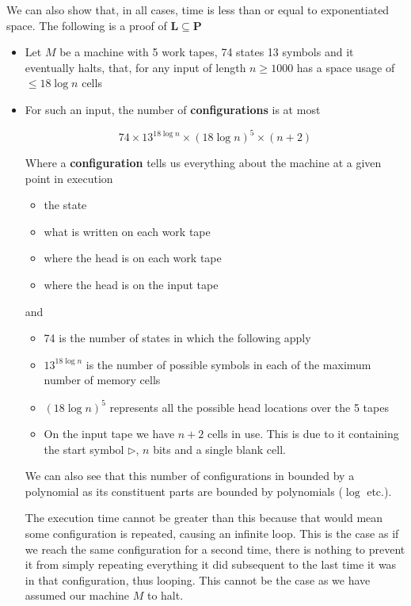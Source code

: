 \documentclass{article}
\begin{document}
  We can also show that, in all cases, time is less than or equal to exponentiated space.
  The following is a proof of $\mathbf{L} \subseteq \mathbf{P} $

  \begin{itemize}
    \item Let $M$ be a machine with 5 work tapes, 74 states 13 symbols and it eventually halts, that, for any input of length $n\geq 1000$ has a space usage of $\leq 18\log n$ cells

    \item For such an input, the number of \textbf{configurations} is at most

          \[
          74 \times 13^{18\log n} \times (18\log n)^{5}\times (n+2)
          \]

          Where a \textbf{configuration} tells us everything about the machine at a given point in execution
          \begin{itemize}
            \item the state
            \item what is written on each work tape
            \item where the head is on each work tape
            \item where the head is on the input tape
          \end{itemize}

          and

          \begin{itemize}
            \item 74 is the number of states in which the following apply
            \item $13^{18\log n}$ is the number of possible symbols in each of the maximum number of memory cells
            \item $(18\log n)^{5}$ represents all the possible head locations over the 5 tapes
            \item On the input tape we have $n+2$ cells in use. This is due to it containing the start symbol $\rhd$, $n$ bits and a single blank cell.
          \end{itemize}

          We can also see that this number of configurations in bounded by a polynomial as its constituent parts are bounded by polynomials ($\log$ etc.).

          The execution time cannot be greater than this because that would mean some configuration is repeated, causing an infinite loop. This is the case as if we reach the same configuration for a second time, there is nothing to prevent it from simply repeating everything it did subsequent to the last time it was in that configuration, thus looping. This cannot be the case as we have assumed our machine $M$ to halt.

  \end{itemize}
\end{document}
